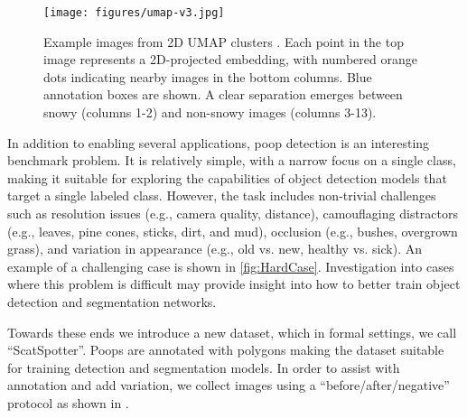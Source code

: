 \documentclass{article}
\begin{document}
\begin{figure*}[t]
\centering
\texttt{[image: figures/umap-v3.jpg]}%
\caption[]{
    Example images from 2D UMAP clusters \cite{mcinnes_umap_2020}.
    Each point in the top image represents a 2D-projected embedding, with numbered orange dots indicating nearby
      images in the bottom columns.
    Blue annotation boxes are shown.
    A clear separation emerges between snowy (columns 1-2) and non-snowy images (columns 3-13).
}
\label{fig:umap_dataset_viz}
\end{figure*}


In addition to enabling several applications, poop detection is an interesting benchmark problem.
It is relatively simple, with a narrow focus on a single class, making it suitable for exploring the
  capabilities of object detection models that target a single labeled class.
However, the task includes non-trivial challenges such as resolution issues (e.g., camera quality,
  distance), camouflaging distractors (e.g., leaves, pine cones, sticks, dirt, and mud), occlusion (e.g., bushes, overgrown
  grass), and variation in appearance (e.g., old vs. new, healthy vs. sick).
An example of a challenging case is shown in \cref{fig:HardCase}.
Investigation into cases where this problem is difficult may provide insight
into how to better train object detection and segmentation networks.

Towards these ends we introduce a new dataset, which 
in formal settings, we call ``ScatSpotter''.
Poops are annotated with polygons making the dataset suitable for training detection and segmentation
  models.
In order to assist with annotation and add variation, we collect images using a ``before/after/negative''
  protocol as shown in .
\end{document}
